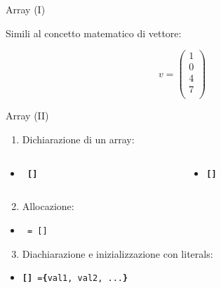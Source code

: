 \begin{frame}{Array (I)}
  
  Simili al concetto matematico di vettore:
  
  \begin{equation*}
    v = \left( \begin{array}{c}
                1 \\
                0 \\
                4 \\
                7 \\
               \end{array}\right)
  \end{equation*}

\end{frame}

\begin{frame}{Array (II)}
  \begin{enumerate}
   \item Dichiarazione di un array:
  \end{enumerate}
  \begin{center}
    \begin{columns}[T]
      \begin{column}[T]{3cm}
	\begin{itemize}
	 \item 	\texttt{ \textbf{[]}}
	\end{itemize}
      \end{column}
      \begin{column}[T]{3cm}
	\begin{itemize}
	 \item \texttt{\textbf{[]} }
	\end{itemize}
      \end{column}
    \end{columns}   
  \end{center}

  \begin{enumerate}
    \setcounter{enumi}{1}
    \item Allocazione:
  \end{enumerate}
  \begin{itemize}
   \item \texttt{ =  []}
  \end{itemize}

  \begin{enumerate}
    \setcounter{enumi}{2}
    \item Diachiarazione e inizializzazione con literals:
  \end{enumerate}
  \begin{itemize}
   \item \texttt{\textbf{[]}  =\textbf{\{}val1, val2, ...\textbf{\}}} 
  \end{itemize}

\end{frame}

